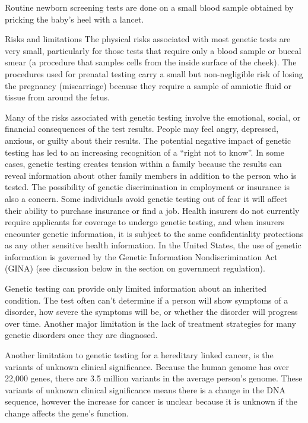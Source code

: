 Routine newborn screening tests are done on a small blood sample obtained by pricking the baby's heel with a lancet.

Risks and limitations
The physical risks associated with most genetic tests are very small, particularly for those tests that require only a blood sample or buccal smear (a procedure that samples cells from the inside surface of the cheek). The procedures used for prenatal testing carry a small but non-negligible risk of losing the pregnancy (miscarriage) because they require a sample of amniotic fluid or tissue from around the fetus.

Many of the risks associated with genetic testing involve the emotional, social, or financial consequences of the test results. People may feel angry, depressed, anxious, or guilty about their results. The potential negative impact of genetic testing has led to an increasing recognition of a ``right not to know''. In some cases, genetic testing creates tension within a family because the results can reveal information about other family members in addition to the person who is tested. The possibility of genetic discrimination in employment or insurance is also a concern. Some individuals avoid genetic testing out of fear it will affect their ability to purchase insurance or find a job. Health insurers do not currently require applicants for coverage to undergo genetic testing, and when insurers encounter genetic information, it is subject to the same confidentiality protections as any other sensitive health information. In the United States, the use of genetic information is governed by the Genetic Information Nondiscrimination Act (GINA) (see discussion below in the section on government regulation).

Genetic testing can provide only limited information about an inherited condition. The test often can't determine if a person will show symptoms of a disorder, how severe the symptoms will be, or whether the disorder will progress over time. Another major limitation is the lack of treatment strategies for many genetic disorders once they are diagnosed.

Another limitation to genetic testing for a hereditary linked cancer, is the variants of unknown clinical significance. Because the human genome has over 22,000 genes, there are 3.5 million variants in the average person's genome. These variants of unknown clinical significance means there is a change in the DNA sequence, however the increase for cancer is unclear because it is unknown if the change affects the gene's function.

